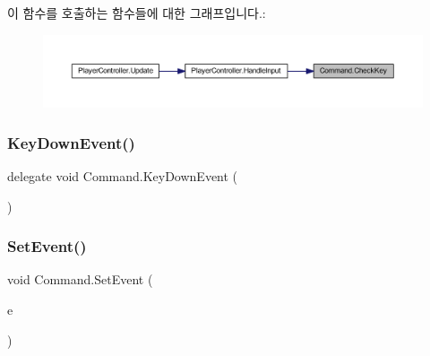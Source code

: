 \begin{DoxyCode}{0}

\end{DoxyCode}
이 함수를 호출하는 함수들에 대한 그래프입니다.\+:
\nopagebreak
\begin{figure}[H]
\begin{center}
\leavevmode
\includegraphics[width=350pt]{d5/d6a/class_command_a1f9dcd759b1d51871f8a6efd30c3a721_icgraph}
\end{center}
\end{figure}
\mbox{\label{class_command_acc714b5e0de57b7f24b2619fff860b9d}} 
\subsubsection{\texorpdfstring{KeyDownEvent()}{KeyDownEvent()}}
{\footnotesize\ttfamily delegate void Command.\+Key\+Down\+Event (\begin{DoxyParamCaption}{ }\end{DoxyParamCaption})}

\mbox{\label{class_command_a306ef92268d70413bf59adaa36a35b07}} 
\subsubsection{\texorpdfstring{SetEvent()}{SetEvent()}}
{\footnotesize\ttfamily void Command.\+Set\+Event (\begin{DoxyParamCaption}\item[{\mbox{\hyperlink{class_command_acc714b5e0de57b7f24b2619fff860b9d}{Key\+Down\+Event}}}]{e }\end{DoxyParamCaption})\hspace{0.3cm}{\ttfamily [inline]}}



